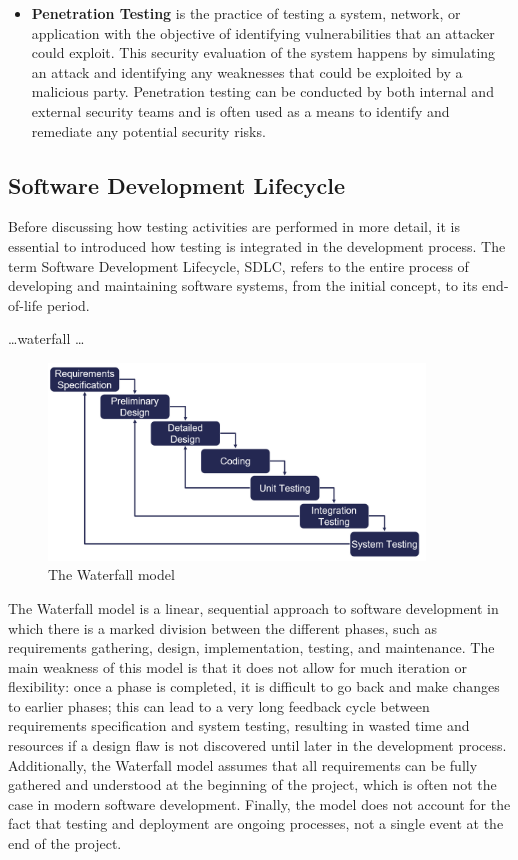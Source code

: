 \begin{itemize}
    \item \textbf{Penetration Testing} is the practice of testing a system, network, or application  with the objective of identifying vulnerabilities that an attacker could exploit. This security evaluation of the system happens by simulating an attack and identifying any weaknesses that could be exploited by a malicious party. Penetration testing can be conducted by both internal and external security teams and is often used as a means to identify and remediate any potential security risks.
\end{itemize}


\subsection{Software Development Lifecycle}
Before discussing how testing activities are performed in more detail, it is essential to introduced how testing is integrated in the development process. The term Software Development Lifecycle, SDLC, refers to the entire process of developing and maintaining software systems, from the initial concept, to its end-of-life period.

\dots waterfall \dots


\begin{figure}[H]
    \centering
    \includegraphics[width=10cm, scale=0.5]{figures/waterfall_model.png}
    \caption{The Waterfall model}
    \label{waterfall_model}
\end{figure}

The Waterfall model is a linear, sequential approach to software development in which there is a marked division between the different phases, such as requirements gathering, design, implementation, testing, and maintenance.
The main weakness of this model is that it does not allow for much iteration or flexibility: once a phase is completed, it is difficult to go back and make changes to earlier phases; this can lead to a very long feedback cycle between requirements specification and system testing, resulting in wasted time and resources if a design flaw is not discovered until later in the development process. Additionally, the Waterfall model assumes that all requirements can be fully gathered and understood at the beginning of the project, which is often not the case in modern software development. Finally, the model does not account for the fact that testing and deployment are ongoing processes, not a single event at the end of the project.


